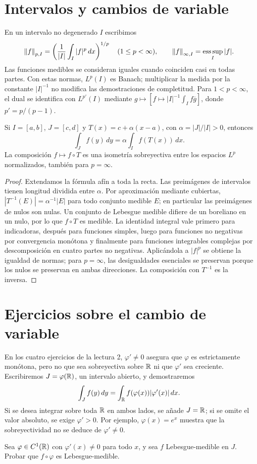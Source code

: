 \section{Intervalos y cambios de variable}
En un intervalo no degenerado $I$ escribimos
\[
 \left\lVert f\right\rVert_{p,I}=\left(\frac1{|I|}\int_I|f|^p\,dx\right)^{1/p}
 \quad(1\leq p<\infty),\qquad
 \left\lVert f\right\rVert_{\infty,I}=\operatorname*{ess\,sup}_{I}|f|.
\]
Las funciones medibles se consideran iguales cuando coinciden casi en todas partes. Con estas normas, $L^p(I)$ es Banach; multiplicar la medida por la constante $|I|^{-1}$ no modifica las demostraciones de completitud. Para $1<p<\infty$, el dual se identifica con $L^{p'}(I)$ mediante $g\mapsto[f\mapsto |I|^{-1}\int_I f\overline g]$, donde $p'=p/(p-1)$.
\begin{proposicion}
Si $I=[a,b]$, $J=[c,d]$ y $T(x)=c+\alpha(x-a)$, con $\alpha=|J|/|I|>0$, entonces
\[
 \int_J f(y)\,dy=\alpha\int_I f(T(x))\,dx.
\]
La composición $f\mapsto f\circ T$ es una isometría sobreyectiva entre los espacios $L^p$ normalizados, también para $p=\infty$.
\end{proposicion}
\begin{proof}
Extendamos la fórmula afín a toda la recta. Las preimágenes de intervalos tienen longitud dividida entre $\alpha$. Por aproximación mediante cubiertas, $|T^{-1}(E)|=\alpha^{-1}|E|$ para todo conjunto medible $E$; en particular las preimágenes de nulos son nulas. Un conjunto de Lebesgue medible difiere de un boreliano en un nulo, por lo que $f\circ T$ es medible. La identidad integral vale primero para indicadoras, después para funciones simples, luego para funciones no negativas por convergencia monótona y finalmente para funciones integrables complejas por descomposición en cuatro partes no negativas. Aplicándola a $|f|^p$ se obtiene la igualdad de normas; para $p=\infty$, las desigualdades esenciales se preservan porque los nulos se preservan en ambas direcciones. La composición con $T^{-1}$ es la inversa.
\end{proof}

\section{Ejercicios sobre el cambio de variable}
\begin{observacion}
En los cuatro ejercicios de la lectura 2, $\varphi'\ne0$ asegura que $\varphi$ es estrictamente monótona, pero no que sea sobreyectiva sobre $\mathbb R$ ni que $\varphi'$ sea creciente. Escribiremos $J=\varphi(\mathbb R)$, un intervalo abierto, y demostraremos
\[
 \int_J f(y)\,dy=\int_\mathbb R f(\varphi(x))|\varphi'(x)|\,dx.
\]
Si se desea integrar sobre toda $\mathbb R$ en ambos lados, se añade $J=\mathbb R$; si se omite el valor absoluto, se exige $\varphi'>0$. Por ejemplo, $\varphi(x)=e^x$ muestra que la sobreyectividad no se deduce de $\varphi'\ne0$.
\end{observacion}
\begin{ejercicio}\label{ej:v4-l02-1}
Sea $\varphi\in C^1(\mathbb R)$ con $\varphi'(x)\ne0$ para todo $x$, y sea $f$ Lebesgue-medible en $J$. Probar que $f\circ\varphi$ es Lebesgue-medible.
\end{ejercicio}

